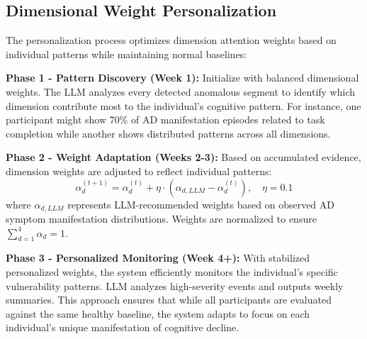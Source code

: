 \documentclass[sigconf, anonymous, 9pt, nonacm]{acmart}
\begin{document}
\subsection{Dimensional Weight Personalization}

The personalization process optimizes dimension attention weights based on individual patterns while maintaining normal baselines:

\noindent\textbf{Phase 1 - Pattern Discovery (Week 1):} Initialize with balanced dimensional weights. The LLM analyzes every detected anomalous segment to identify which dimension contribute most to the individual's cognitive pattern. For instance, one participant might show 70\% of AD manifestation episodes related to task completion while another shows distributed patterns across all dimensions.

\noindent\textbf{Phase 2 - Weight Adaptation (Weeks 2-3):} Based on accumulated evidence, dimension weights are adjusted to reflect individual patterns:
\begin{equation*}
\alpha_d^{(t+1)} = \alpha_d^{(t)} + \eta \cdot (\alpha_{d,LLM} - \alpha_d^{(t)}), \quad \eta = 0.1
\end{equation*}
where $\alpha_{d,LLM}$ represents LLM-recommended weights based on observed AD symptom manifestation distributions. Weights are normalized to ensure $\sum_{d=1}^{4}\alpha_d = 1$.

\noindent\textbf{Phase 3 - Personalized Monitoring (Week 4+):} With stabilized personalized weights, the system efficiently monitors the individual's specific vulnerability patterns. LLM analyzes high-severity events and outputs weekly summaries. This approach ensures that while all participants are evaluated against the same healthy baseline, the system adapts to focus on each individual's unique manifestation of cognitive decline.
\end{document}
